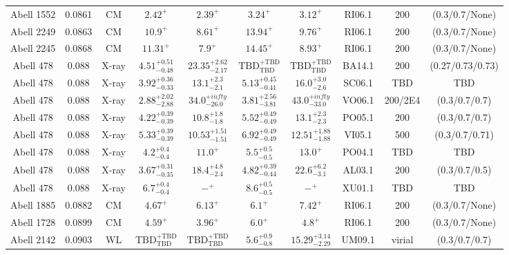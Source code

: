 \begin{table}
\begin{tabular}{cccccccccc}
Abell 1552 & 0.0861 & CM & ${2.42}^{+}_{}$ & ${2.39}^{+}_{}$ & ${3.24}^{+}_{}$ & ${3.12}^{+}_{}$ & RI06.1 & 200 & (0.3/0.7/None) \\
Abell 2249 & 0.0863 & CM & ${10.9}^{+}_{}$ & ${8.61}^{+}_{}$ & ${13.94}^{+}_{}$ & ${9.76}^{+}_{}$ & RI06.1 & 200 & (0.3/0.7/None) \\
Abell 2245 & 0.0868 & CM & ${11.31}^{+}_{}$ & ${7.9}^{+}_{}$ & ${14.45}^{+}_{}$ & ${8.93}^{+}_{}$ & RI06.1 & 200 & (0.3/0.7/None) \\
Abell 478 & 0.088 & X-ray & ${4.51}^{+0.51}_{-0.48}$ & ${23.35}^{+2.62}_{-2.17}$ & ${\mathrm{TBD}}^{+\mathrm{TBD}}_{\mathrm{TBD}}$ & ${\mathrm{TBD}}^{+\mathrm{TBD}}_{\mathrm{TBD}}$ & BA14.1 & 200 & (0.27/0.73/0.73) \\
Abell 478 & 0.088 & X-ray & ${3.92}^{+0.36}_{-0.33}$ & ${13.1}^{+2.3}_{-2.1}$ & ${5.13}^{+0.45}_{-0.41}$ & ${16.0}^{+3.0}_{-2.6}$ & SC06.1 & TBD & TBD \\
Abell 478 & 0.088 & X-ray & ${2.88}^{+2.02}_{-2.88}$ & ${34.0}^{+infty}_{-26.0}$ & ${3.81}^{+2.56}_{-3.81}$ & ${43.0}^{+infty}_{-33.0}$ & VO06.1 & 200/2E4 & (0.3/0.7/0.7) \\
Abell 478 & 0.088 & X-ray & ${4.22}^{+0.39}_{-0.39}$ & ${10.8}^{+1.8}_{-1.8}$ & ${5.52}^{+0.49}_{-0.49}$ & ${13.1}^{+2.3}_{-2.3}$ & PO05.1 & 200 & (0.3/0.7/0.7) \\
Abell 478 & 0.088 & X-ray & ${5.33}^{+0.39}_{-0.39}$ & ${10.53}^{+1.51}_{-1.51}$ & ${6.92}^{+0.49}_{-0.49}$ & ${12.51}^{+1.88}_{-1.88}$ & VI05.1 & 500 & (0.3/0.7/0.71) \\
Abell 478 & 0.088 & X-ray & ${4.2}^{+0.4}_{-0.4}$ & ${11.0}^{+}_{}$ & ${5.5}^{+0.5}_{-0.5}$ & ${13.0}^{+}_{}$ & PO04.1 & TBD & TBD \\
Abell 478 & 0.088 & X-ray & ${3.67}^{+0.31}_{-0.35}$ & ${18.4}^{+4.8}_{-2.4}$ & ${4.82}^{+0.39}_{-0.44}$ & ${22.6}^{+6.2}_{-3.1}$ & AL03.1 & 200 & (0.3/0.7/0.5) \\
Abell 478 & 0.088 & X-ray & ${6.7}^{+0.4}_{-0.4}$ & ${-}^{+}_{}$ & ${8.6}^{+0.5}_{-0.5}$ & ${-}^{+}_{}$ & XU01.1 & TBD & TBD \\
Abell 1885 & 0.0882 & CM & ${4.67}^{+}_{}$ & ${6.13}^{+}_{}$ & ${6.1}^{+}_{}$ & ${7.42}^{+}_{}$ & RI06.1 & 200 & (0.3/0.7/None) \\
Abell 1728 & 0.0899 & CM & ${4.59}^{+}_{}$ & ${3.96}^{+}_{}$ & ${6.0}^{+}_{}$ & ${4.8}^{+}_{}$ & RI06.1 & 200 & (0.3/0.7/None) \\
Abell 2142 & 0.0903 & WL & ${\mathrm{TBD}}^{+\mathrm{TBD}}_{\mathrm{TBD}}$ & ${\mathrm{TBD}}^{+\mathrm{TBD}}_{\mathrm{TBD}}$ & ${5.6}^{+0.9}_{-0.8}$ & ${15.29}^{+3.14}_{-2.29}$ & UM09.1 & virial & (0.3/0.7/0.7) \\

\end{tabular}
\end{table}
